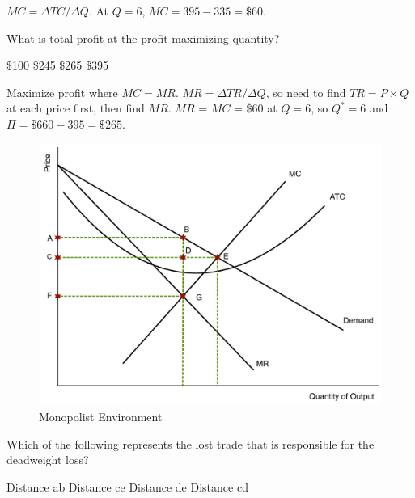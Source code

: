 \documentclass[addpoints,11pt]{exam}
\theoremstyle{definition}
\begin{document}
\begin{questions}
			\begin{solution}
				$MC = \Delta TC/ \Delta Q$. At $Q=6$, $MC = 395 - 335 = \$60.$
			\end{solution}
			

			\question \label{blah4} What is total profit at the profit-maximizing quantity?
			
			\begin{choices}
				\choice \$100
				\choice \$245
				\CorrectChoice \$265
				\choice \$395
			\end{choices}
			
			\begin{solution}
				Maximize profit where $MC = MR$. $MR = \Delta TR/\Delta Q$, so need to find $TR = P\times Q$ at each price first, then find $MR$. $MR$ = $MC$ = \$60 at $Q=6$, so $Q^* =6$ and $\Pi = \$660 - 395 = \$265$.
			\end{solution}



\begin{figure}[h!]
	\centering
	\includegraphics[scale=.4]{Exam2_MC10.pdf}
	\caption{Monopolist Environment}
	\label{MC10}
\end{figure}

\newpage


	\question \label{blah5} Which of the following represents the lost trade that is responsible for the deadweight loss?
	
	\begin{choices}
		\choice Distance ab
		\choice Distance ce
		\CorrectChoice Distance de
		\choice Distance cd
	\end{choices}
	

\end{questions}
\end{document}

